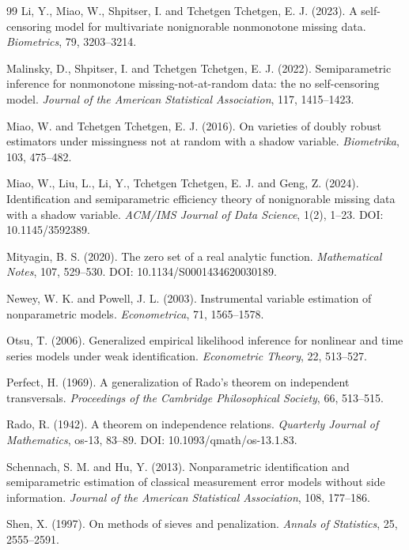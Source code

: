 \documentclass[11pt,a4paper]{ltjsarticle}
\theoremstyle{remark}
\begin{document}
\begin{thebibliography}{99}
Li, Y., Miao, W., Shpitser, I. and Tchetgen Tchetgen, E. J. (2023).
A self-censoring model for multivariate nonignorable nonmonotone missing data.
\emph{Biometrics}, 79, 3203--3214.

Malinsky, D., Shpitser, I. and Tchetgen Tchetgen, E. J. (2022).
Semiparametric inference for nonmonotone missing-not-at-random data: the no self-censoring model.
\emph{Journal of the American Statistical Association}, 117, 1415--1423.

Miao, W. and Tchetgen Tchetgen, E. J. (2016).
On varieties of doubly robust estimators under missingness not at random with a shadow variable.
\emph{Biometrika}, 103, 475--482.

Miao, W., Liu, L., Li, Y., Tchetgen Tchetgen, E. J. and Geng, Z. (2024).
Identification and semiparametric efficiency theory of nonignorable missing data with a shadow variable.
\emph{ACM/IMS Journal of Data Science}, 1(2), 1--23.
DOI: 10.1145/3592389.

Mityagin, B. S. (2020).
The zero set of a real analytic function.
\emph{Mathematical Notes}, 107, 529--530.
DOI: 10.1134/S0001434620030189.

Newey, W. K. and Powell, J. L. (2003).
Instrumental variable estimation of nonparametric models.
\emph{Econometrica}, 71, 1565--1578.


Otsu, T. (2006).
Generalized empirical likelihood inference for nonlinear and time series models under weak identification.
\emph{Econometric Theory}, 22, 513--527.

Perfect, H. (1969).
A generalization of Rado's theorem on independent transversals.
\emph{Proceedings of the Cambridge Philosophical Society}, 66, 513--515.

Rado, R. (1942).
A theorem on independence relations.
\emph{Quarterly Journal of Mathematics}, os-13, 83--89.
DOI: 10.1093/qmath/os-13.1.83.

Schennach, S. M. and Hu, Y. (2013).
Nonparametric identification and semiparametric estimation of classical measurement error models without side information.
\emph{Journal of the American Statistical Association}, 108, 177--186.

Shen, X. (1997).
On methods of sieves and penalization.
\emph{Annals of Statistics}, 25, 2555--2591.



\end{thebibliography}
\end{document}

